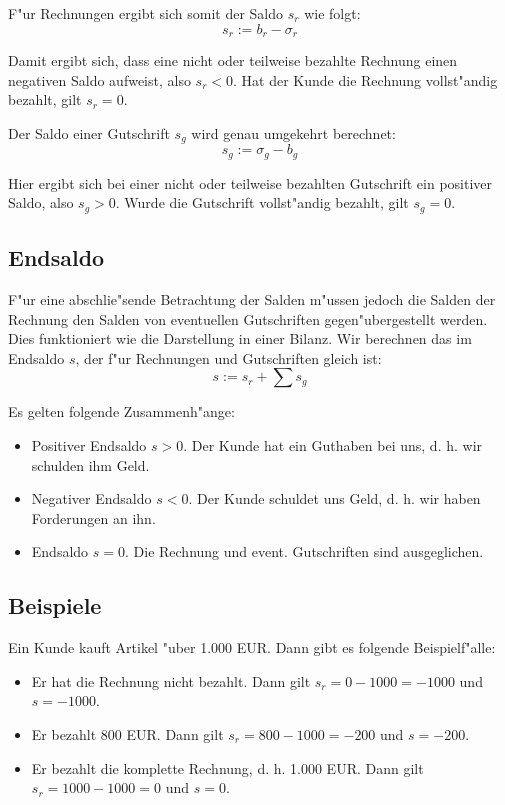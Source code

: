 \documentclass[a4paper]{article}
\numberwithin{equation}{section}
\begin{document}
\noindent F"ur Rechnungen ergibt sich somit der Saldo $s_r$ wie folgt:
\begin{equation}s_r := b_r - \sigma_r\end{equation}

\noindent Damit ergibt sich, dass eine nicht oder teilweise bezahlte Rechnung 
einen negativen Saldo aufweist, also $s_r < 0$. Hat der Kunde die Rechnung 
vollst"andig bezahlt, gilt $s_r = 0$.

Der Saldo einer Gutschrift $s_g$ wird genau umgekehrt berechnet:
\begin{equation}s_g := \sigma_g - b_g\end{equation}

\noindent Hier ergibt sich bei einer nicht oder teilweise bezahlten Gutschrift
ein positiver Saldo, also $s_g > 0$. Wurde die Gutschrift vollst"andig bezahlt,
gilt $s_g = 0$.


\subsection{Endsaldo}
F"ur eine abschlie"sende Betrachtung der Salden m"ussen jedoch die Salden der
Rechnung den Salden von eventuellen Gutschriften gegen"ubergestellt werden. Dies
funktioniert wie die Darstellung in einer Bilanz. Wir berechnen das im Endsaldo
$s$, der f"ur Rechnungen und Gutschriften gleich ist:
\begin{equation}s := s_r + \sum s_g\end{equation}

\noindent Es gelten folgende Zusammenh"ange:
\begin{itemize}
  \item Positiver Endsaldo $s > 0$. Der Kunde hat ein Guthaben bei uns, d. h.
    wir schulden ihm Geld.
  \item Negativer Endsaldo $s < 0$. Der Kunde schuldet uns Geld, d. h. wir haben
    Forderungen an ihn.
  \item Endsaldo $s = 0$. Die Rechnung und event. Gutschriften sind 
    ausgeglichen.
\end{itemize}


\subsection{Beispiele}
Ein Kunde kauft Artikel "uber 1.000 EUR. Dann gibt es folgende Beispielf"alle:
\begin{itemize}
  \item Er hat die Rechnung nicht bezahlt. Dann gilt $s_r = 0 - 1000 = -1000$
    und $s = -1000$.
  \item Er bezahlt 800 EUR. Dann gilt $s_r = 800 - 1000 = -200$ und $s = -200$.
  \item Er bezahlt die komplette Rechnung, d. h. 1.000 EUR. Dann gilt
    $s_r = 1000 - 1000 = 0$ und $s = 0$.
\end{itemize}
\end{document}
